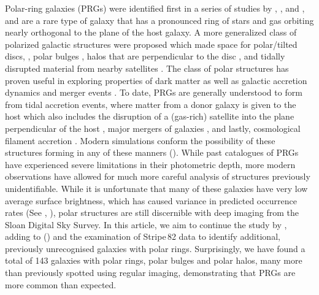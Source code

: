\documentclass[letter]{aa}
\begin{document}
Polar-ring galaxies (PRGs) were identified first in a series of studies by \citet{1978AJ.....83.1360S}, \citet{1978ApJ...226L.115B}, and \citet{1983AJ.....88..909S}, and are a rare type of galaxy that has a pronounced ring of stars and gas orbiting nearly orthogonal to the plane of the host galaxy. A more generalized class of polarized galactic structures were proposed which made space for polar/tilted discs, \citep{1999ApJ...519L.127B,2020MNRAS.497.2039M}, polar bulges \citep{2012MNRAS.423L..79C,2015AstL...41..748R}, halos that are perpendicular to the disc \citep{2016ApJ...823...19C,2020MNRAS.494.1751M,2021MNRAS.506.5030M}, and tidally disrupted material from nearby satellites \citep{2010AJ....140..962M,2019A&A...632L..13M,2023A&A...671A.141M}. The class of polar structures has proven useful in exploring properties of dark matter \citep{1987ApJ...314..439W,1994ApJ...436..629S,1996A&A...305..763C,2003ApJ...585..730I,2011MNRAS.418..244M,2012MNRAS.425.1967S,2014MNRAS.441.2650K,2015BaltA..24...76M} as well as galactic accretion dynamics \citep{2008ApJ...689..678B} and merger events \citep{1998ApJ...499..635B,2003A&A...401..817B}. To date, PRGs are generally understood to form from tidal accretion events, where matter from a donor galaxy is given to the host \citep[][]{schweizer1983colliding,1997A&A...325..933R} which also includes the disruption of a (gas-rich) satellite into the plane perpendicular of the host \citep{1991wdir.conf..112R,1992ApJ...389L..55K}, major mergers of galaxies \citep[][]{bekki1997formation,bekki1998formation,2003A&A...401..817B}, and lastly, cosmological filament accretion \citep{2006ApJ...636L..25M,2008ApJ...689..678B}. Modern simulations conform the possibility of these structures forming in any of these manners (\citealt{2019MNRAS.485..464L,2021MNRAS.504.5702W,2023arXiv231018597S}). While past catalogues of PRGs have experienced severe limitations in their photometric depth, more modern observations have allowed  for much more careful analysis of structures previously unidentifiable. While it is unfortunate that many of these galaxies have very low average surface brightness, which has caused variance in predicted occurrence rates (See \citet{reshetnikov2011polar}, \citet{2019MNRAS.483.1470R}), polar structures are still discernible with deep imaging from the Sloan Digital Sky Survey. In this article, we aim to continue the study by \citet{mosenkov2022unveiling}, adding to (\citet{2024AstL...}) and the examination of Stripe\,82 data to identify additional, previously unrecognised galaxies with polar rings. Surprisingly, we have found a total of 143 galaxies with polar rings, polar bulges and polar halos, many more than previously spotted using regular imaging, demonstrating that PRGs are more common than expected. 
\end{document}
